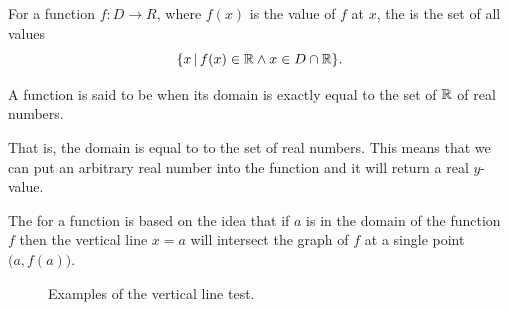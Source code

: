 \begin{defn}
  For a function $f: D \rightarrow R$,
  where $f(x)$ is the value of $f$ at $x$,
  the 
  is the set of all values
  \begin{equation}
    \{ { x } \,|\, { f(x) \in \mathbb{R} \land  x \in D \cap \mathbb{R} } \}.
    \label{eq:functions:naturaldomain}
  \end{equation}
\end{defn}

\begin{defn}
  A function is said to be  when
  its domain is exactly equal to the set of $\mathbb{R}$ of real numbers.
\end{defn}

That is, the domain is equal to to the set of real numbers.
This means that we can put an arbitrary real number into the function and it 
will return a real $y$-value.

The 
for a function is based on the idea that if
$a$ is in the domain of the function $f$ then the vertical line $x=a$ will 
intersect the graph of $f$ at a single point $ \big(a,f(a)\big)$.

\begin{figure}
  \begin{center}
  \end{center}
  \caption{Examples of the vertical line test.}
\end{figure}


